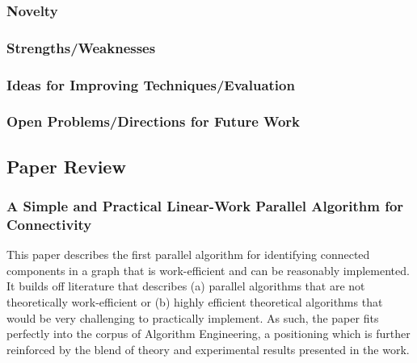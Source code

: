 \subsubsection{Novelty}


\subsubsection{Strengths/Weaknesses}


\subsubsection{Ideas for Improving Techniques/Evaluation}


\subsubsection{Open Problems/Directions for Future Work}


\newpage

\subsection{Paper Review}
\subsubsection{A Simple and Practical Linear-Work Parallel Algorithm for Connectivity}

This paper describes the first parallel algorithm for identifying connected components in a graph that is work-efficient and can be reasonably implemented. It builds off literature that describes (a) parallel algorithms that are not theoretically work-efficient or (b) highly efficient theoretical algorithms that would be very challenging to practically implement. As such, the paper fits perfectly into the corpus of Algorithm Engineering, a positioning which is further reinforced by the blend of theory and experimental results presented in the work. 

